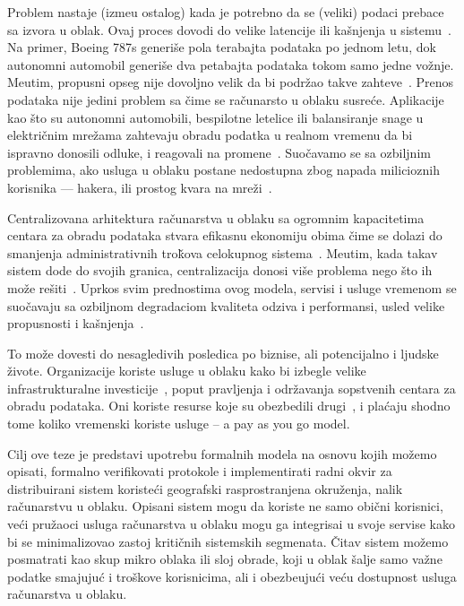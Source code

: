 Problem nastaje (izme\dj u ostalog) kada je potrebno da se (veliki) podaci prebace sa izvora u oblak. Ovaj proces dovodi do velike latencije ili ka\v snjenja u sistemu~\cite {HossainRH18}. Na primer, Boeing 787s generi\v se pola terabajta podataka po jednom letu, dok autonomni automobil generiše dva petabajta podataka tokom samo jedne vo\v znje. Me\dj utim, propusni opseg nije dovoljno velik da bi podr\v zao takve zahteve~\cite {CaoZS18}. Prenos podataka nije jedini problem sa \v cime se ra\v cunarsto u oblaku susre\'ce. Aplikacije kao \v sto su autonomni automobili, bespilotne letelice ili balansiranje snage u elektri\v cnim mre\v zama zahtevaju obradu podatka u realnom vremenu da bi ispravno donosili odluke, i reagovali na promene~\cite {CaoZS18}. Suo\v cavamo se sa ozbiljnim problemima, ako usluga u oblaku postane nedostupna zbog napada milicioznih korisnika --- hakera, ili prostog kvara na mre\v zi~\cite{GunawiHSLSAE16}.

Centralizovana arhitektura ra\v cunarstva u oblaku sa ogromnim kapacitetima centara za obradu podataka stvara efikasnu ekonomiju obima \v cime se dolazi do smanjenja administrativnih tro\v kova celokupnog sistema~\cite{BariBEGPRZZ13}. Me\dj utim, kada takav sistem dod\dj e do svojih granica, centralizacija donosi vi\v se problema nego \v sto ih mo\v ze re\v siti~\cite{GunawiHSLSAE16, LopezMEDHIBFR15}. Uprkos svim prednostima ovog modela, servisi i usluge vremenom se suo\v cavaju sa ozbiljnom degradaciom kvaliteta odziva i performansi, usled velike propusnosti i ka\v snjenja~\cite {KarimIWGSYO16}. 

To mo\v ze dovesti do nesagledivih posledica po biznise, ali potencijalno i ljudske živote. Organizacije koriste usluge u oblaku kako bi izbegle velike infrastrukturalne investicije~\cite {MonsalveCC18}, poput pravljenja i održavanja sopstvenih centara za obradu podataka. Oni koriste resurse koje su obezbedili drugi~\cite{Satyanarayanan17}, i pla\'caju shodno tome koliko vremenski koriste usluge -- a pay as you go model.

Cilj ove teze je predstavi upotrebu formalnih modela na osnovu kojih mo\v zemo opisati, formalno verifikovati protokole i implementirati radni okvir za distribuirani sistem koriste\'ci geografski rasprostranjena okru\v zenja, nalik ra\v cunarstvu u oblaku. Opisani sistem mogu da koriste ne samo obi\v cni korisnici, ve\'ci pru\v zaoci usluga ra\v cunarstva u oblaku mogu ga integrisai u svoje servise kako bi se minimalizovao zastoj kritičnih sistemskih segmenata. \v Citav sistem mo\v zemo posmatrati kao skup mikro oblaka ili sloj obrade, koji u oblak \v salje samo va\v zne podatke smajuju\'c i tro\v skove korisnicima, ali i obezbe\dj uju\'ci ve\'cu dostupnost usluga ra\v cunarstva u oblaku.


